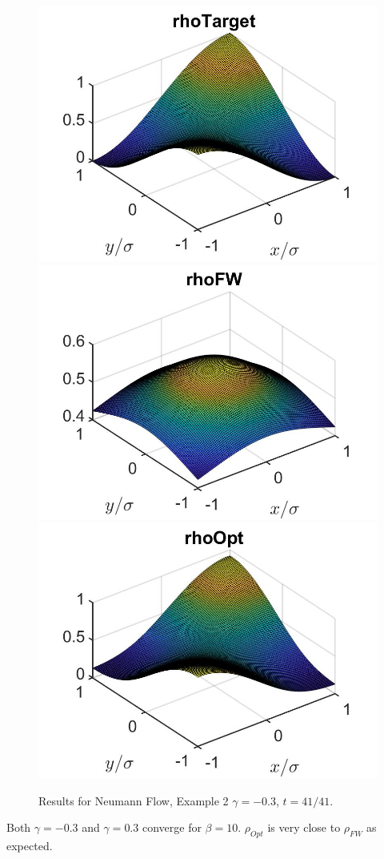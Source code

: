 \documentclass[11pt, a4paper]{article}
\theoremstyle{definition}
\begin{document}
\begin{figure}[h]
	\includegraphics[scale=0.3]{rhoHat2DN4b.jpg}
	\includegraphics[scale=0.3]{rhoFW2DN4b.jpg}
	\includegraphics[scale=0.3]{rhoOpt2D4b.jpg}
	\caption{Results for Neumann Flow, Example 2 $\gamma = -0.3$, $t = 41/41$.}
	\label{Ex12DN4b}
\end{figure}
Both $\gamma = -0.3$ and $\gamma = 0.3$ converge for $\beta = 10$. $\rho_{Opt}$ is very close to $\rho_{FW}$ as expected.
\end{document}
